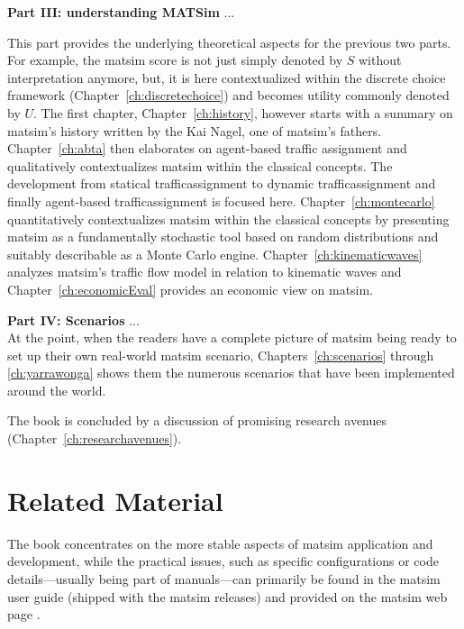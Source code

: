 \textbf{Part III: understanding MATSim} ... \\


This part provides the underlying theoretical aspects for the previous two parts. For example, the \gls{matsim} \gls{score} is not just simply denoted by $S$ without interpretation anymore, but, it is here contextualized within the discrete choice framework (Chapter~\ref{ch:discretechoice}) and becomes \gls{utility} commonly denoted by $U$. 
The first chapter, Chapter~\ref{ch:history}, however starts with a summary on \gls{matsim}'s history written by the Kai Nagel, one of \gls{matsim}'s fathers. 
Chapter~\ref{ch:abta} then elaborates on agent-based traffic assignment and qualitatively contextualizes \gls{matsim} within the classical concepts. The development from statical \gls{trafficassignment} to dynamic \gls{trafficassignment} and finally agent-based \gls{trafficassignment} is focused here.  
Chapter~\ref{ch:montecarlo} quantitatively contextualizes \gls{matsim} within the classical concepts by presenting \gls{matsim} as a fundamentally stochastic tool based on random distributions and suitably describable as a Monte Carlo engine.
Chapter~\ref{ch:kinematicwaves} analyzes \gls{matsim}'s traffic flow model in relation to kinematic waves and Chapter~\ref{ch:economicEval} provides an economic view on \gls{matsim}. 

\textbf{Part IV: Scenarios} ... \\
At the point, when the readers have a complete picture of \gls{matsim} being ready to set up their own real-world \gls{matsim} \gls{scenario}, Chapters~\ref{ch:scenarios} through \ref{ch:yarrawonga} shows them the numerous scenarios that have been implemented around the world.

The book is concluded by a discussion of promising research avenues (Chapter~\ref{ch:researchavenues}).

\section*{Related Material}
The book concentrates on the more stable aspects of \gls{matsim} application and development, while the practical issues, such as specific configurations or code details---usually being part of manuals---can primarily be found in the \gls{matsim} user guide (shipped with the \gls{matsim} releases) and provided on the \gls{matsim} web page \citep[][]{MATSim_Userguide_2015}.

